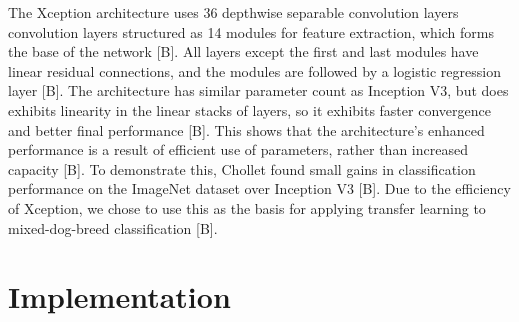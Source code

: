 \documentclass[12pt]{report}
\begin{document}
\par The Xception architecture uses 36 depthwise separable convolution layers convolution layers structured as 14 modules for feature extraction, which forms the base of the network [B]. All layers except the first and last modules have linear residual connections, and the modules are followed by a logistic regression layer [B].  The architecture has similar parameter count as Inception V3, but does exhibits linearity in the linear stacks of layers, so it exhibits faster convergence and better final performance [B]. This shows that the architecture’s enhanced performance is a result of efficient use of parameters, rather than increased capacity [B]. To demonstrate this, Chollet found small gains in classification performance on the ImageNet dataset over Inception V3 [B]. Due to the efficiency of Xception, we chose to use this as the basis for applying transfer learning to mixed-dog-breed classification [B].	

		
\section* {Implementation} 
\end{document}

